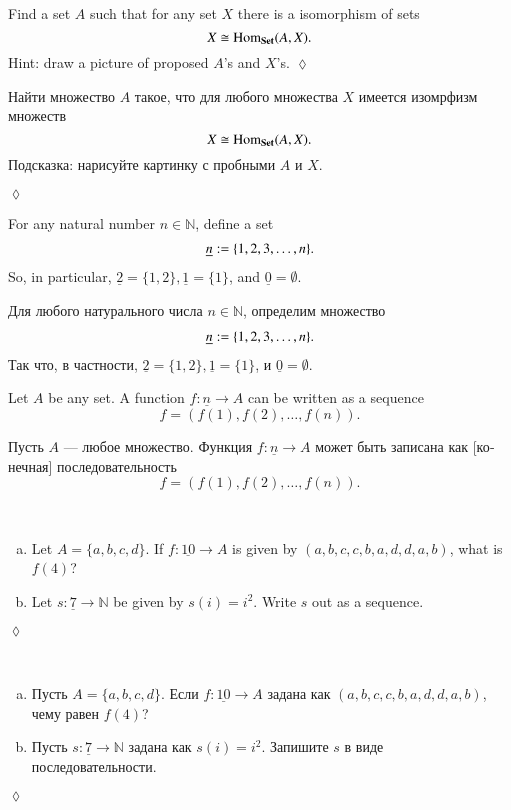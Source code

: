 \documentclass[a4paper]{book}
\def\tn{\textnormal}
\def\NN{{\mathbb N}}
\def\Hom{\tn{Hom}}
\def\to{\rightarrow}
\def\taking{\colon}
\def\iso{\cong}
\def\ul{\underline}
\def\Set{{\bf Set}}
\theoremstyle{myth}
\newtheorem{excENG}[envENG]{\begin{english}Exercise\end{english}}
\newenvironment{exerciseENG}{\begin{excENG}}{\hspace*{\fill}$\lozenge$\end{excENG}}
\newtheorem{excRUS}[envRUS]{\begin{russian}Упражнение\end{russian}}
\newenvironment{exerciseRUS}{\begin{excRUS}}{\hspace*{\fill}$\lozenge$\end{excRUS}}
\def\sexc{\begin{enumerate}[a.)]\setlength{\itemsep}{.1cm}\setlength{\parskip}{.1cm}\item}
\def\next{\item}
\def\endsexc{\end{enumerate}}
\begin{document}
\begin{english}
\begin{exerciseENG}\label{exc:generator for set}
Find a set $A$ such that for any set $X$ there is a isomorphism of sets $$X\iso\Hom_\Set(A,X).$$ Hint: draw a picture of proposed $A$'s and $X$'s.
\end{exerciseENG}

\begin{exerciseRUS}\label{exc:generator for set}
\begin{russian}Найти множество $A$ такое, что для любого множества $X$ имеется изомрфизм множеств $$X\iso\Hom_\Set(A,X).$$ Подсказка: нарисуйте картинку с пробными $A$ и $X$.
\end{russian}
\end{exerciseRUS}

For any natural number $n\in\NN$, define a set 
\begin{align}\label{dia:underline n}\index{a symbol!$\ul{n}$}
\ul{n}:=\{1,2,3,\ldots,n\}.
\end{align}
So, in particular, $\ul{2}=\{1,2\}, \ul{1}=\{1\}$, and $\ul{0}=\emptyset$. 

\begin{russian}
Для любого натурального числа $n\in\NN$, определим множество 
\begin{align}\label{dia:underline n}\index{a symbol!$\ul{n}$}
\ul{n}:=\{1,2,3,\ldots,n\}.
\end{align}
Так что, в частности, $\ul{2}=\{1,2\}, \ul{1}=\{1\}$, и $\ul{0}=\emptyset$. 
\end{russian}

Let $A$ be any set. A function $f\taking\ul{n}\to A$ can be written as a sequence $$f=(f(1),f(2),\ldots,f(n)).$$

\begin{russian}Пусть $A$ — любое множество. Функция $f\taking\ul{n}\to A$ может быть записана как [конечная] последовательность $$f=(f(1),f(2),\ldots,f(n)).$$\end{russian}

\begin{exerciseENG}\label{exc:sequence}~
\sexc Let $A=\{a,b,c,d\}$. If $f\taking\ul{10}\to A$ is given by $(a,b,c,c,b,a,d,d,a,b)$, what is $f(4)$?
\next Let $s\taking\ul{7}\to\NN$ be given by $s(i)=i^2$. Write $s$ out as a sequence.
\endsexc
\end{exerciseENG}

\begin{exerciseRUS}\label{exc:sequence}~
\begin{russian} 
\sexc Пусть $A=\{a,b,c,d\}$. Если $f\taking\ul{10}\to A$ задана как $(a,b,c,c,b,a,d,d,a,b)$, чему равен $f(4)$?
\next Пусть $s\taking\ul{7}\to\NN$ задана как $s(i)=i^2$. Запишите $s$ в виде последовательности.
\endsexc
\end{russian}
\end{exerciseRUS}


\end{english}
\end{document}
